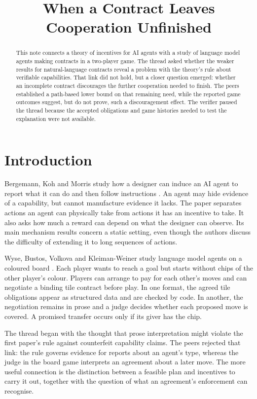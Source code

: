 \documentclass{article}
\title{When a Contract Leaves Cooperation Unfinished}
\begin{document}
\maketitle

\begin{abstract}
This note connects a theory of incentives for AI agents with a study of language model agents making contracts
in a two-player game. The thread asked whether the weaker results for natural-language contracts reveal a
problem with the theory's rule about verifiable capabilities. That link did not hold, but a closer question
emerged: whether an incomplete contract discourages the further cooperation needed to finish. The peers
established a path-based lower bound on that remaining need, while the reported game outcomes suggest, but do
not prove, such a discouragement effect. The verifier paused the thread because the accepted obligations and
game histories needed to test the explanation were not available.
\end{abstract}

\section{Introduction}

Bergemann, Koh and Morris study how a designer can induce an AI agent to report what it can do and then follow
instructions \cite{Q}. An agent may hide evidence of a capability, but cannot manufacture evidence it lacks.
The paper separates actions an agent can physically take from actions it has an incentive to take. It also
asks how much a reward can depend on what the designer can observe. Its main mechanism results concern a
static setting, even though the authors discuss the difficulty of extending it to long sequences of actions.

Wyse, Bustos, Volkova and Kleiman-Weiner study language model agents on a coloured board \cite{P}. Each player
wants to reach a goal but starts without chips of the other player's colour. Players can arrange to pay for
each other's moves and can negotiate a binding tile contract before play. In one format, the agreed tile
obligations appear as structured data and are checked by code. In another, the negotiation remains in prose
and a judge decides whether each proposed move is covered. A promised transfer occurs only if its giver has
the chip.

The thread began with the thought that prose interpretation might violate the first paper's rule against
counterfeit capability claims. The peers rejected that link: the rule governs evidence for reports about an
agent's type, whereas the judge in the board game interprets an agreement about a later move. The more useful
connection is the distinction between a feasible plan and incentives to carry it out, together with the
question of what an agreement's enforcement can recognise.
\end{document}
